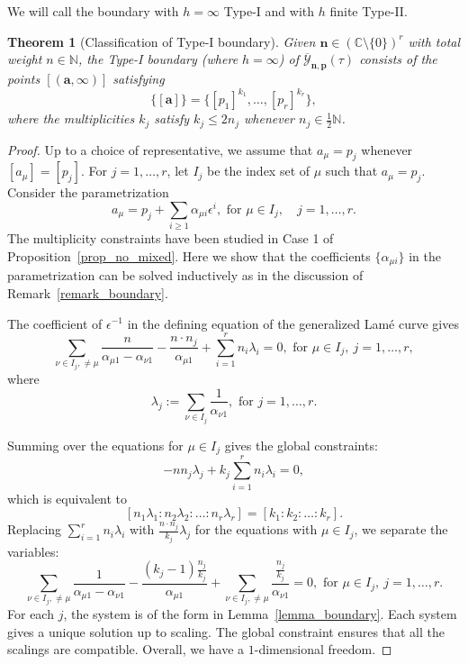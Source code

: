 \documentclass[11pt]{amsart}
\newtheorem{theorem}{Theorem}[section]
\theoremstyle{remark}
\numberwithin{equation}{section}
\begin{document}
We will call the boundary with $h=\infty$ Type-I and with $h$ finite Type-II. 

\begin{theorem}[Classification of Type-I boundary] \label{special-pt}
Given $\mathbf{n} \in (\mathbb{C} \setminus \{0\} )^r$ with total weight $n\in \mathbb{N}$,
the Type-I boundary (where $h=\infty$) of $\overline{\mathcal{Y}}_{\mathbf{n},\mathbf{p}}(\tau)$ consists of the points $[(\mathbf{a}, \infty)]$ satisfying
\[
    \{[\mathbf{a}]\} = \{[p_1]^{k_1}, \dots, [p_r]^{k_r}\},
\]
where the multiplicities $k_j$ satisfy $k_j \leq 2n_j$ whenever $n_j \in \frac{1}{2}\mathbb{N}$.
\end{theorem}

\begin{proof}
Up to a choice of representative, we assume that $a_\mu = p_j$ whenever $[a_\mu] = [p_j]$. For $j=1, \dots, r$, let $I_j$ be the index set of $\mu$ such that $a_\mu = p_j$. Consider the parametrization
\[
    a_\mu = p_j + \sum_{i \geq 1} \alpha_{\mu i} \epsilon^i, \text{ for } \mu \in I_j, \quad j=1,\dots,r.
\]
The multiplicity constraints have been studied in Case 1 of Proposition~\ref{prop_no_mixed}. 
Here we show that the coefficients $\{ \alpha_{\mu i} \}$ in the parametrization can be solved inductively as in the discussion of Remark~\ref{remark_boundary}.

The coefficient of $\epsilon^{-1}$ in the defining equation of the generalized Lam\'e curve gives
\[
    \sum_{\nu\in I_j,\neq \mu}\frac{n}{\alpha_{\mu 1} - \alpha_{\nu 1}} - \frac{n \cdot n_j}{\alpha_{\mu 1}} + \sum_{i=1}^r n_i \lambda_i = 0, \text{ for } \mu\in I_j, \ j=1,\dots,r,
\]
where 
\[
    \lambda_j := \sum_{\nu \in I_j} \frac{1}{\alpha_{\nu 1}}, \text{ for } j=1,\dots,r.
\]

Summing over the equations for $\mu \in I_j$ gives the global constraints:
\[
    - n n_j \lambda_j + k_j \sum_{i=1}^r n_i \lambda_i = 0, 
\]
which is equivalent to
\[
    [ n_1 \lambda_1 : n_2 \lambda_2 : \dots : n_r \lambda_r ] = [ k_1 : k_2 : \dots : k_r ]. 
\]
Replacing $\sum_{i=1}^r n_i \lambda_i$ with $\frac{n \cdot n_j}{k_j} \lambda_j$ for the equations with $\mu \in I_j$, we separate the variables:
\[
    \sum_{\nu\in I_j,\neq \mu}\frac{1}{\alpha_{\mu 1} - \alpha_{\nu 1}} - \frac{(k_j-1) \frac{n_j}{k_j} }{\alpha_{\mu 1}} + \sum_{\nu\in I_j,\neq \mu} \frac{ \frac{n_j}{k_j} }{\alpha_{\nu 1}} =0, \text{ for }\mu\in I_j, \ j=1,\dots,r.
\]
For each $j$, the system is of the form in Lemma~\ref{lemma_boundary}. Each system gives a unique solution up to scaling. The global constraint ensures that all the scalings are compatible. Overall, we have a $1$-dimensional freedom. 


\end{proof}
\end{document}
